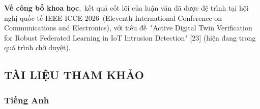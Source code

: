 \textbf{Về công bố khoa học},~kết quả cốt lõi của luận văn đã được đệ trình tại hội nghị quốc tế IEEE ICCE 2026~(Eleventh International Conference on Communications and Electronics), với tiêu đề~"Active Digital Twin Verification for Robust Federated Learning in IoT Intrusion Detection" {[}23{]} (hiện đang trong quá trình chờ duyệt).

\subsection{TÀI LIỆU THAM KHẢO}\label{tuxe0i-liux1ec7u-tham-khux1ea3o}

\subsubsection{Tiếng Anh}\label{tiux1ebfng-anh}

